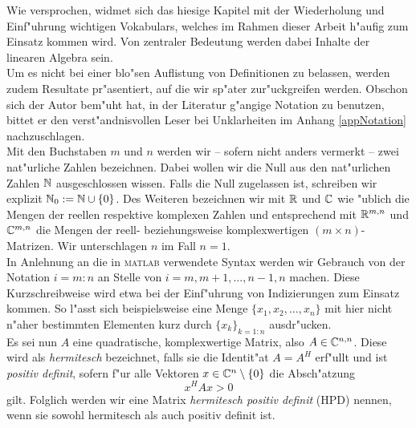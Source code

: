 Wie versprochen, widmet sich das hiesige Kapitel mit der Wiederholung und Einf"uhrung wichtigen Vokabulars, welches im Rahmen dieser Arbeit h"aufig zum Einsatz kommen wird.
Von zentraler Bedeutung werden dabei Inhalte der linearen Algebra sein.\\

Um es nicht bei einer blo"sen Auflistung von Definitionen zu belassen, werden zudem Resultate pr"asentiert, auf die wir sp"ater zur"uckgreifen werden.
Obschon sich der Autor bem"uht hat,
in der Literatur g"angige Notation zu benutzen, bittet er den
verst"andnisvollen Leser bei Unklarheiten im Anhang \ref{appNotation} nachzuschlagen.\\

Mit den Buchstaben $m$ und $n$ werden wir -- sofern nicht anders vermerkt -- zwei nat"urliche Zahlen bezeichnen. Dabei wollen wir die Null aus den nat"urlichen Zahlen $\mathbb{N}$ ausgeschlossen wissen.
Falls die Null zugelassen ist, schreiben wir explizit $\mathbb{N}_0 := \mathbb{N}\cup\{0\}$.
Des Weiteren bezeichnen wir mit $\mathbb{R}$ und $\mathbb{C}$ wie "ublich die Mengen der reellen respektive komplexen Zahlen und entsprechend mit $\mathbb{R}^{m,n}$ und $\mathbb{C}^{m,n}$ die Mengen der reell- beziehungsweise komplexwertigen $(m\times n)$-Matrizen. Wir unterschlagen $n$ im Fall $n=1$.\\

In Anlehnung an die in \textsc{matlab} verwendete Syntax werden wir Gebrauch von der Notation $i=m:n$ an Stelle von $i=m,m+1,\ldots,n-1,n$ machen.
Diese Kurzschreibweise wird etwa bei der Einf"uhrung von Indizierungen zum Einsatz kommen.
So l"asst sich beispielsweise eine Menge $\{x_1,x_2,\ldots,x_n\}$ mit hier nicht n"aher bestimmten Elementen kurz durch $\{x_k\}_{k=1:n}$ ausdr"ucken.\\

Es sei nun $A$ eine quadratische, komplexwertige Matrix, also $A\in\mathbb{C}^{n,n}$. Diese wird als \emph{hermitesch} bezeichnet, falls sie die Identit"at $A=A^H$ erf"ullt und ist \emph{positiv definit}, sofern
f"ur alle Vektoren $x\in\mathbb{C}^n \setminus\{0\}$ die Absch"atzung
\[
x^H A x > 0
\]
gilt. Folglich werden wir eine Matrix \emph{hermitesch positiv definit} (HPD)
nennen, wenn sie sowohl hermitesch als auch positiv definit ist.\\

